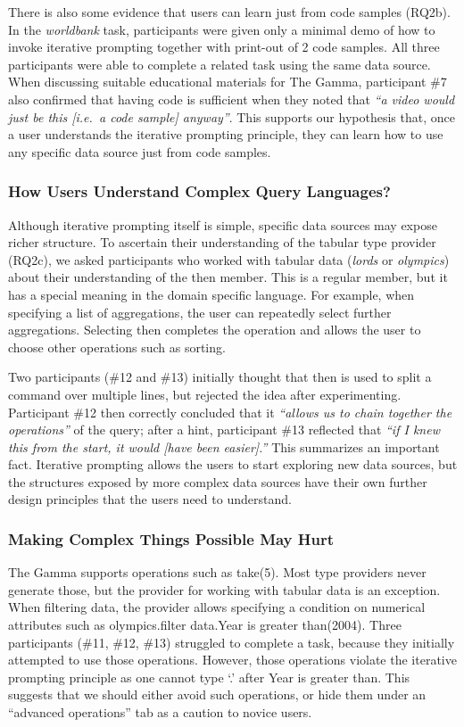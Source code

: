 \documentclass[manuscript,review,anonymous]{acmart}
\newcommand{\ikvd}[1]{{\fontfamily{zi4}\selectfont\small #1}}
\begin{document}
There is also some evidence that users can learn just from code samples (RQ2b). In the
\emph{worldbank} task, participants were given only a minimal demo of how to invoke iterative
prompting together with print-out of 2 code samples. All three participants were able to complete
a related task using the same data source. When discussing suitable educational materials for
The Gamma, participant \#7 also confirmed that having code is sufficient when they noted that
\emph{``a video would just be this [i.e.~a code sample] anyway''}. This supports our hypothesis
that, once a user understands the iterative prompting principle, they can learn how to use any
specific data source just from code samples.

\subsubsection*{How Users Understand Complex Query Languages?}
Although iterative prompting itself is simple, specific data sources may
expose richer structure. To ascertain their understanding of the tabular type provider (RQ2c), we
asked participants who worked with tabular data (\emph{lords} or \emph{olympics}) about their
understanding of the  \ikvd{then} member. This is a regular member, but it has a
special meaning in the domain specific language. For example, when specifying a list of
aggregations, the user can repeatedly select further aggregations. Selecting \ikvd{then} completes
the operation and allows the user to choose other operations such as sorting.

Two participants (\#12 and \#13) initially thought that \ikvd{then} is used to split a command
over multiple lines, but rejected the idea after experimenting.
Participant \#12 then correctly concluded that it \emph{``allows us
to chain together the operations''} of the query; after a hint, participant \#13 reflected
that \emph{``if I knew this from the start, it would [have been easier].''} This summarizes an
important fact. Iterative prompting allows the users to start exploring new data sources, but
the structures exposed by more complex data sources have their own further design principles that
the users need to understand.

\subsubsection*{Making Complex Things Possible May Hurt}
The Gamma supports operations such as \ikvd{take(5)}. Most type
providers never generate those, but the provider for working with tabular data is an exception.
When filtering data, the provider allows specifying a condition on numerical attributes such as
\ikvd{olympics.\textquotesingle filter data\textquotesingle.\textquotesingle Year is greater than\textquotesingle(2004)}.
%
Three participants (\#11, \#12, \#13) struggled to complete a task, because they
initially attempted to use those operations. However, those operations violate the iterative prompting
principle as one cannot type `.' after \ikvd{\textquotesingle Year is greater than\textquotesingle}.
This suggests that we should either avoid such operations, or hide them under an ``advanced operations''
tab as a caution to novice users.
\end{document}

